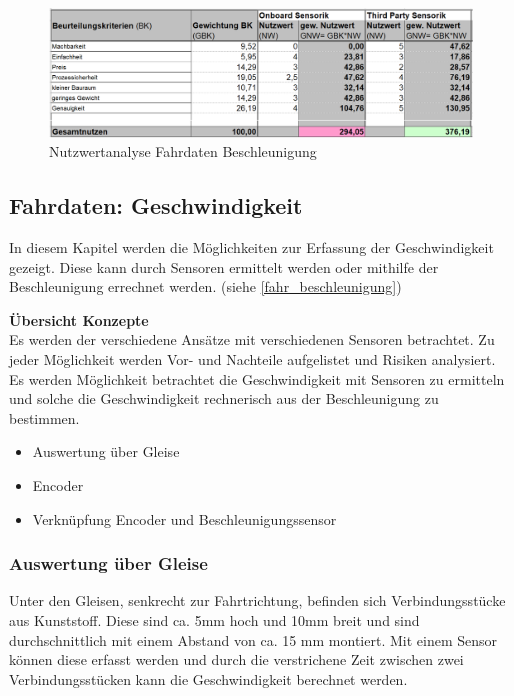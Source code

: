 \documentclass[../../main.tex]{subfiles}
\begin{document}
    \begin{figure}[H]
        \centering
        \includegraphics[width=1.0\textwidth]{Nutzweranalyse_Fahrdaten_Beschleunigung.png}
        \caption {Nutzwertanalyse Fahrdaten Beschleunigung}
        \label{fig:fahr_nutzwertanalyse_beschleunigung}
    \end{figure}

    \subsection{Fahrdaten: Geschwindigkeit} \label{fahr_geschwindigkeit}
    In diesem Kapitel werden die Möglichkeiten zur Erfassung der Geschwindigkeit gezeigt. Diese kann durch Sensoren ermittelt werden oder mithilfe der Beschleunigung errechnet werden. (siehe \ref{fahr_beschleunigung})

    \textbf{Übersicht Konzepte}\\
    Es werden der verschiedene Ansätze mit verschiedenen Sensoren betrachtet. Zu jeder Möglichkeit werden Vor- und Nachteile aufgelistet und Risiken analysiert.
    Es werden Möglichkeit betrachtet die Geschwindigkeit mit Sensoren zu ermitteln und solche die Geschwindigkeit rechnerisch aus der Beschleunigung zu bestimmen.
    \begin{itemize}
        \item Auswertung über Gleise
        \item Encoder
        \item Verknüpfung Encoder und Beschleunigungssensor
    \end{itemize}

    \subsubsection{Auswertung über Gleise}
    Unter den Gleisen, senkrecht zur Fahrtrichtung, befinden sich Verbindungsstücke aus Kunststoff. Diese sind ca. 5mm hoch und 10mm breit und sind durchschnittlich mit einem Abstand von ca. 15 mm montiert. Mit einem Sensor können diese erfasst werden und durch die verstrichene Zeit zwischen zwei Verbindungsstücken kann die Geschwindigkeit berechnet werden.
\end{document}
